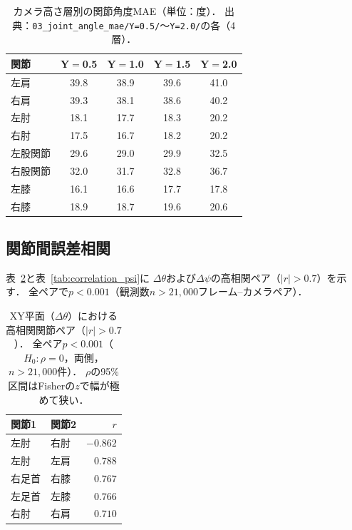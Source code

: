 \documentclass[twocolumn]{article}
\begin{document}
\begin{table}[!t]
\centering
\caption{カメラ高さ層別の関節角度MAE（単位：度）．
  出典：\texttt{03\_joint\_angle\_mae/Y=0.5/}〜\texttt{Y=2.0/}の各（4層）．}
\label{tab:mae_by_layer}
\small
\begin{tabular}{lcccc}
\toprule
関節 & Y$=$0.5 & Y$=$1.0 & Y$=$1.5 & Y$=$2.0 \\
\midrule
左肩  & 39.8 & 38.9 & 39.6 & 41.0 \\
右肩  & 39.3 & 38.1 & 38.6 & 40.2 \\
左肘  & 18.1 & 17.7 & 18.3 & 20.2 \\
右肘  & 17.5 & 16.7 & 18.2 & 20.2 \\
左股関節 & 29.6 & 29.0 & 29.9 & 32.5 \\
右股関節 & 32.0 & 31.7 & 32.8 & 36.7 \\
左膝  & 16.1 & 16.6 & 17.7 & 17.8 \\
右膝  & 18.9 & 18.7 & 19.6 & 20.6 \\
\bottomrule
\end{tabular}
\end{table}

\subsection{関節間誤差相関}

表~\ref{tab:correlation_theta}と表~\ref{tab:correlation_psi}に
$\Delta\theta$および$\Delta\psi$の高相関ペア（$|r|>0.7$）を示す．
全ペアで$p<0.001$（観測数$n>21{,}000$フレーム--カメラペア）．

\begin{table}[!t]
\centering
\caption{XY平面（$\Delta\theta$）における高相関関節ペア（$|r|>0.7$）．
  全ペア$p<0.001$（$H_0:\rho=0$，両側，$n>21{,}000$件）．
  $\rho$の95\%区間はFisherの$z$で幅が極めて狭い．}
\label{tab:correlation_theta}
\small
\begin{tabular}{llr}
\toprule
関節1        & 関節2        & $r$ \\
\midrule
左肘    & 右肘   & $-0.862$ \\
左肘    & 左肩   &  $0.788$ \\
右足首  & 右膝   &  $0.767$ \\
左足首  & 左膝   &  $0.766$ \\
右肘    & 右肩   &  $0.710$ \\
\bottomrule
\end{tabular}
\end{table}
\end{document}
